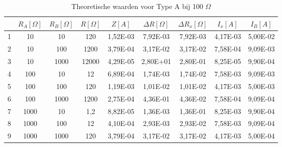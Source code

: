 \begin{table}[H]
    \centering
    \label{tab:TA100}
    \caption{Theoretische waarden voor Type A bij 100 $\Omega$}
    \begin{tabular}{| c | c | c | c | c | c | c | c | c |}
        \hline
                & $R_A [\Omega]$    & $R_B [\Omega]$    & $R [\Omega]$  & $Z [A]$   & $\Delta R [\Omega]$   & $\Delta R_x [\Omega]$ & $I_x [A]$                 & $I_B [A]$             \\ \hline
        1       & 10                & 10                & 120           & 1,52E-03  & 7,92E-03              & 7,92E-03              & 4,17E-03                  & 5,00E-02 \\ \hline
        2       & 10                & 100               & 1200          & 3,79E-04  & 3,17E-02              & 3,17E-02              & 7,58E-04                  & 9,09E-03  \\ \hline   
        3       & 10                & 1000              & 12000         & 4,29E-05  & 2,80E+01              & 2,80E-01              & 8,25E-05                  & 9,90E-04  \\ \hline
        4       & 100               & 10                & 12            & 6,89E-04  & 1,74E-03              & 1,74E-02              & 7,58E-03                  & 9,09E-03  \\ \hline
        5	& 100	   &100	&120	&1,19E-03	&1,01E-02	&1,01E-02	&4,17E-03	&5,00E-03 \\ \hline
        6	&100	&1000	&1200	&2,75E-04	&4,36E-01	&4,36E-02	&7,58E-04	&9,09E-04 \\ \hline
        7	&1000	&10	&1,2	&8,82E-05	&1,36E-03	&1,36E-01	&8,25E-03	&9,90E-04 \\ \hline 
        8	&1000	&100	&12	&4,10E-04	&2,93E-03	&2,93E-02	&7,58E-03	&9,09E-04 \\ \hline
        9	&1000	&1000	&120	&3,79E-04	&3,17E-02	&3,17E-02	&4,17E-03	&5,00E-04 \\ \hline
    \end{tabular}
\end{table}
